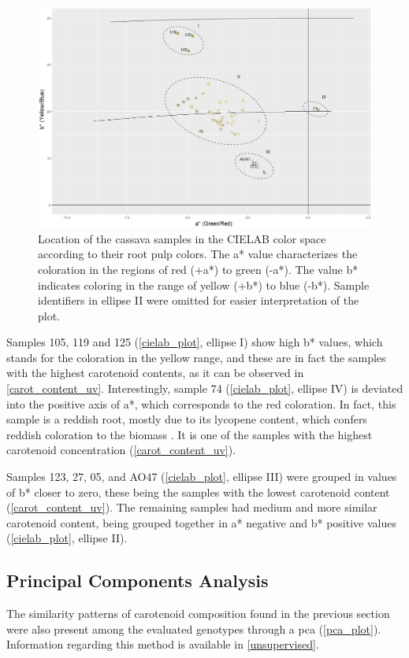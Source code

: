 \begin{figure}[h]
	\centering
	\includegraphics[width=0.7\linewidth]{Imagens/Case_study/cielab_plot2}
	\caption{Location of the cassava samples in the CIELAB color space according to their root pulp colors. The a* value characterizes the coloration in the regions of red (+a*) to green (-a*). The value b* indicates coloring in the range of yellow (+b*) to blue (-b*). Sample identifiers in ellipse II were omitted for easier interpretation of the plot.}
	\label{cielab_plot}
\end{figure}


Samples 105, 119 and 125 (\autoref{cielab_plot}, ellipse I) show high b* values, which stands for the coloration in the yellow range, and these are in fact the samples with the highest carotenoid contents, as it can be observed in \autoref{carot_content_uv}. Interestingly, sample 74 (\autoref{cielab_plot}, ellipse IV) is deviated into the positive axis of a*, which corresponds to the red coloration. In fact, this sample is a reddish root, mostly due to its lycopene content, which confers reddish coloration to the biomass \citep{melendez2007relationship}. It is one of the samples with the highest carotenoid concentration (\autoref{carot_content_uv}).

Samples 123, 27, 05, and AO47 (\autoref{cielab_plot}, ellipse III) were grouped in values of b* closer to zero, these being the samples with the lowest carotenoid content (\autoref{carot_content_uv}). The remaining samples had medium and more similar carotenoid content, being grouped together in a* negative and b* positive values (\autoref{cielab_plot}, ellipse II).


\subsection{Principal Components Analysis} 

The similarity patterns of carotenoid composition found in the previous section were also present among the evaluated genotypes through a \gls{pca} (\autoref{pca_plot}). Information regarding this method is available in \autoref{unsupervised}. 

